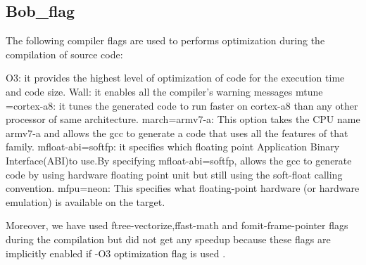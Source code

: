 \subsection{Bob\_flag}

 The following compiler flags are used to performs optimization during the compilation of source code:

O3: it provides the highest level of optimization of code for the execution time and code size.
Wall: it enables all the compiler's warning messages
mtune =cortex-a8:  it tunes the generated code to run faster on cortex-a8 than any other processor of same architecture.
march=armv7-a: This option takes the CPU name armv7-a and allows the gcc to generate a code that uses all the features of that family.
mfloat-abi=softfp: it specifies which floating point Application Binary Interface(ABI)to use.By specifying mfloat-abi=softfp, allows the gcc to generate code by using hardware floating point unit but still using the soft-float calling convention.
mfpu=neon: This specifies what floating-point hardware (or hardware emulation) is available on the target.

Moreover, we have used ftree-vectorize,ffast-math and fomit-frame-pointer flags during the compilation but did not get any speedup because these flags are implicitly enabled if -O3 optimization flag is used .

